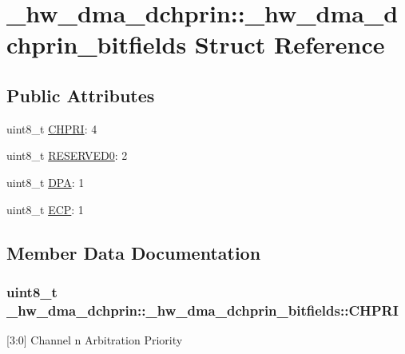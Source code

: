 \hypertarget{struct__hw__dma__dchprin_1_1__hw__dma__dchprin__bitfields}{}\section{\+\_\+hw\+\_\+dma\+\_\+dchprin\+:\+:\+\_\+hw\+\_\+dma\+\_\+dchprin\+\_\+bitfields Struct Reference}
\label{struct__hw__dma__dchprin_1_1__hw__dma__dchprin__bitfields}
\subsection*{Public Attributes}
\begin{DoxyCompactItemize}
\item 
uint8\+\_\+t \hyperlink{struct__hw__dma__dchprin_1_1__hw__dma__dchprin__bitfields_a6f8c276334f1e99edc1ca1e16e6970e2}{C\+H\+P\+RI}\+: 4
\item 
uint8\+\_\+t \hyperlink{struct__hw__dma__dchprin_1_1__hw__dma__dchprin__bitfields_ab1a280c8aebfbd66f42bb3d5bc706ece}{R\+E\+S\+E\+R\+V\+E\+D0}\+: 2
\item 
uint8\+\_\+t \hyperlink{struct__hw__dma__dchprin_1_1__hw__dma__dchprin__bitfields_a9887471c70c6e24d22a0a4097994b86f}{D\+PA}\+: 1
\item 
uint8\+\_\+t \hyperlink{struct__hw__dma__dchprin_1_1__hw__dma__dchprin__bitfields_a5da3d7856bcfd896dab5df559abceaee}{E\+CP}\+: 1
\end{DoxyCompactItemize}


\subsection{Member Data Documentation}
\subsubsection[{\texorpdfstring{C\+H\+P\+RI}{CHPRI}}]{\setlength{\rightskip}{0pt plus 5cm}uint8\+\_\+t \+\_\+hw\+\_\+dma\+\_\+dchprin\+::\+\_\+hw\+\_\+dma\+\_\+dchprin\+\_\+bitfields\+::\+C\+H\+P\+RI}\hypertarget{struct__hw__dma__dchprin_1_1__hw__dma__dchprin__bitfields_a6f8c276334f1e99edc1ca1e16e6970e2}{}\label{struct__hw__dma__dchprin_1_1__hw__dma__dchprin__bitfields_a6f8c276334f1e99edc1ca1e16e6970e2}
\mbox{[}3\+:0\mbox{]} Channel n Arbitration Priority 
